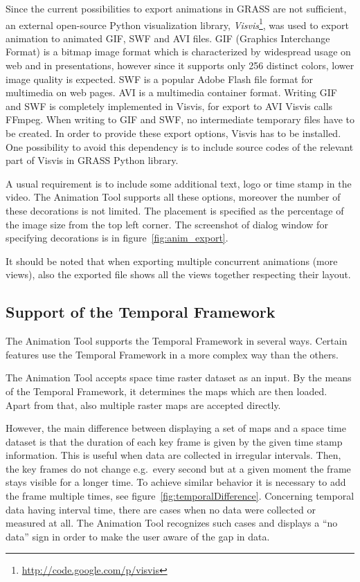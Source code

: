 \documentclass[a4paper,12pt,oneside]{book}
\newcommand{\tf}{Temporal Framework\xspace}
\newcommand{\at}{Animation Tool\xspace}
\begin{document}
\begin{description}
    Since the current possibilities to export animations in GRASS are not sufficient,
    an external open-source Python visualization library,
    \emph{Visvis}\footnote{\url{http://code.google.com/p/visvis}},
    was used to export animation to animated GIF, SWF and AVI files.
    GIF (Graphics Interchange Format) is a bitmap image format which is characterized
    by widespread usage on web and in presentations, however since it supports only 256 distinct colors,
    lower image quality is expected.
    SWF is a popular Adobe Flash file format for multimedia on web pages.
    AVI is a multimedia container format.
    Writing GIF and SWF is completely implemented in Visvis, for export to AVI Visvis
    calls FFmpeg. When writing to GIF and SWF, no intermediate temporary files have to be created.
    In order to provide these export options, Visvis has to be installed.
    One possibility to avoid this dependency is to include source codes of the relevant
    part of Visvis in GRASS Python library.

      A usual requirement is to include some additional text, logo or time stamp in the video.
      The \at supports all these options, moreover the number of these decorations is not limited.
      The placement is specified as the percentage of the image size from the top left corner.
      The screenshot of dialog window for specifying decorations is in figure~\ref{fig:anim_export}.

      It should be noted that when exporting multiple concurrent animations (more views),
      also the exported file shows all the views together respecting their layout.

\end{description}

\subsection{Support of the \tf}
\label{sec:wx.animation:support}
The \at supports the \tf in several ways. Certain features use the \tf in a more complex way than the others.

The \at accepts space time raster dataset as an input. By the means of the \tf, it determines the maps which are then loaded.
Apart from that, also multiple raster maps are accepted directly.

However, the main difference between displaying a set of maps and a space time dataset is
that the duration of each key frame is given by the given time stamp information.
This is useful when data are collected in irregular intervals.
Then, the key frames do not change e.g.\ every second but at a given moment the frame stays visible for a longer time.
To achieve similar behavior it is necessary to add the frame multiple times, see figure~\ref{fig:temporalDifference}.
Concerning temporal data having interval time, there are cases when no data were collected or measured at all.
The \at recognizes such cases and displays a ``no data'' sign in order to make the user aware of the gap in data.
\end{document}
